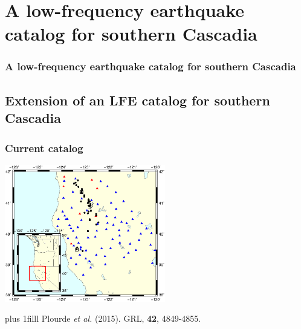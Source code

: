 \documentclass{beamer}
\newcommand{\btVFill}{\vskip0pt plus 1filll}
\begin{document}

	\section{A low-frequency earthquake catalog for southern Cascadia}

	\begin{frame}
		\frametitle{A low-frequency earthquake catalog for southern Cascadia}
	\end{frame}


	\subsection{Extension of an LFE catalog for southern Cascadia}
	
	\begin{frame}
		\frametitle{Current catalog}
		\begin{center}
			\includegraphics[trim={1cm 3cm 1cm 10cm}, clip, width=7cm]{catalog_SC/families_map.eps}
		\end{center}
		\btVFill
		\tiny{Plourde \textit{et al.}  (2015). GRL, \textbf{42}, 4849-4855.}
	\end{frame}
\end{document}

